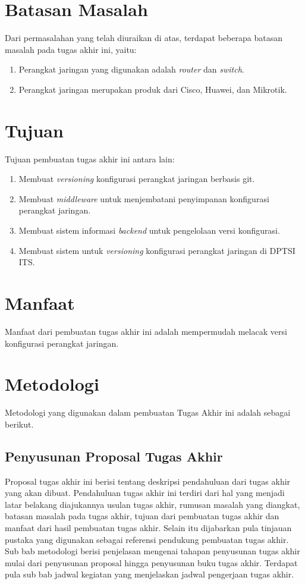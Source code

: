	\section{Batasan Masalah}
		Dari permasalahan yang telah diuraikan di atas, terdapat beberapa batasan masalah pada tugas akhir ini, yaitu:
		\begin{enumerate}
			\item Perangkat jaringan yang digunakan adalah \textit{router} dan \textit{switch}.
            \item Perangkat jaringan merupakan produk dari Cisco, Huawei, dan Mikrotik.
           
		\end{enumerate}

	\section{Tujuan}
       	Tujuan pembuatan tugas akhir ini antara lain:
        \begin{enumerate}
        	\item Membuat \textit{versioning} konfigurasi perangkat jaringan berbasis git.
        	\item Membuat \textit{middleware} untuk menjembatani penyimpanan konfigurasi perangkat jaringan.
        	\item Membuat sistem informasi \textit{backend} untuk pengelolaan versi konfigurasi.
        	\item Membuat sistem untuk \textit{versioning} konfigurasi perangkat jaringan di DPTSI ITS.
        \end{enumerate}
        
	\section{Manfaat}
    	Manfaat dari pembuatan tugas akhir ini adalah mempermudah melacak versi konfigurasi perangkat jaringan.\\
    	
   	\section{Metodologi}
   		Metodologi yang digunakan dalam pembuatan Tugas Akhir ini adalah sebagai berikut.
   		
   		\subsection{Penyusunan Proposal Tugas Akhir}
   			Proposal tugas akhir ini berisi tentang deskripsi pendahuluan dari tugas akhir yang akan dibuat. Pendahuluan tugas akhir ini terdiri dari hal yang menjadi latar belakang diajukannya usulan tugas akhir, rumusan masalah yang diangkat, batasan masalah pada tugas akhir, tujuan dari pembuatan tugas akhir dan manfaat dari hasil pembuatan tugas akhir. Selain itu dijabarkan pula tinjauan pustaka yang digunakan sebagai referensi pendukung pembuatan tugas akhir. Sub bab metodologi berisi penjelasan mengenai tahapan penyusunan tugas akhir mulai dari penyusunan proposal hingga penyusunan buku tugas akhir. Terdapat pula sub bab jadwal kegiatan yang menjelaskan jadwal pengerjaan tugas akhir.
   			
